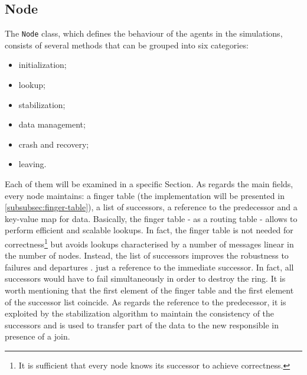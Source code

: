 \documentclass[11pt,twocolumn,letterpaper]{article}
\begin{document}
	
	\subsection{Node}
	\label{subsec:node}
	The \texttt{Node} class, which defines the behaviour of the agents in the simulations, consists of several methods that can be grouped into six categories:
	\vspace{-2pt}
	\begin{itemize}
		\itemsep0pt
		\item initialization;
		\item lookup;
		\item stabilization;
		\item data management;
		\item crash and recovery;
		\item leaving.
	\end{itemize}
	\vspace{-1pt}
	Each of them will be examined in a specific Section. As regards the main fields, every node maintains: a finger table (the implementation will be presented in \cref{subsubsec:finger-table}), a list of successors, a reference to the predecessor and a key-value map for data. \newline
	Basically, the finger table - as a routing table - allows to perform efficient and scalable lookups. In fact, the finger table is not needed for correctness\footnote{It is sufficient that every node knows its successor to achieve correctness.} but avoids lookups characterised by a number of messages linear in the number of nodes. \newline
	Instead, the list of successors improves the robustness to failures and departures . just a reference to the immediate successor. In fact, all successors would have to fail simultaneously in order to destroy the ring. It is worth mentioning that the first element of the finger table and the first element of the successor list coincide. \newline
	As regards the reference to the predecessor, it is exploited by the stabilization algorithm to maintain the consistency of the successors and is used to transfer part of the data to the new responsible in presence of a join.
	
\end{document}
